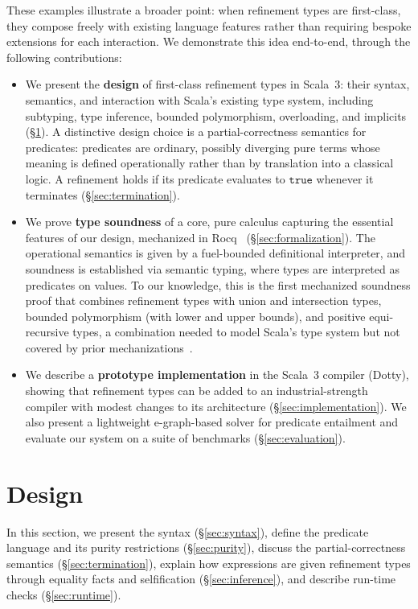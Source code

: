 \documentclass[acmsmall]{acmart}
\begin{document}
These examples illustrate a broader point: when refinement types are first-class, they compose freely with existing language features rather than requiring bespoke extensions for each interaction. We demonstrate this idea end-to-end, through the following contributions:
\begin{itemize}
  \item We present the \textbf{design} of first-class refinement types in Scala~3: their syntax, semantics, and interaction with Scala's existing type system, including subtyping, type inference, bounded polymorphism, overloading, and implicits (\S\ref{sec:design}). A distinctive design choice is a partial-correctness semantics for predicates: predicates are ordinary, possibly diverging pure terms whose meaning is defined operationally rather than by translation into a classical logic. A refinement holds if its predicate evaluates to $\texttt{true}$ whenever it terminates (\S\ref{sec:termination}).
  \item We prove \textbf{type soundness} of a core, pure calculus capturing the essential features of our design, mechanized in Rocq~\cite{rocq} (\S\ref{sec:formalization}). The operational semantics is given by a fuel-bounded definitional interpreter, and soundness is established via semantic typing, where types are interpreted as predicates on values. To our knowledge, this is the first mechanized soundness proof that combines refinement types with union and intersection types, bounded polymorphism (with lower and upper bounds), and positive equi-recursive types, a combination needed to model Scala's type system but not covered by prior mechanizations~\cite{hamza2019, borkowski2022, sun2024}.
  \item We describe a \textbf{prototype implementation} in the Scala~3 compiler (Dotty), showing that refinement types can be added to an industrial-strength compiler with modest changes to its architecture (\S\ref{sec:implementation}). We also present a lightweight e-graph-based solver for predicate entailment and evaluate our system on a suite of benchmarks (\S\ref{sec:evaluation}).
\end{itemize}

\section{Design}\label{sec:design}

In this section, we present the syntax (\S\ref{sec:syntax}), define the predicate language and its purity restrictions (\S\ref{sec:purity}), discuss the partial-correctness semantics (\S\ref{sec:termination}), explain how expressions are given refinement types through equality facts and selfification (\S\ref{sec:inference}), and describe run-time checks (\S\ref{sec:runtime}).
\end{document}
